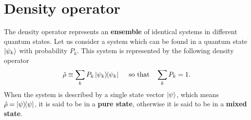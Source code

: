 %
\chapter{Density operator}
\label{ap:density-operator}

The density operator represents an \textbf{ensemble} of identical systems in different quantum states. Let us consider a system which can be found in a quantum state $ \ket{\psi_k} $ with probability $ P_{k} $. This system is represented by the following density operator
\begin{equation}
	\hat{\rho} \equiv \sum_{k} P_{k} \ketbra{\psi_k}{\psi_k}\ \ \ \ \textrm{so that}\ \ \ \sum_k P_k = 1.
\end{equation}
When the system is described by a single state vector $ \ket{\psi} $, which means $ \hat{\rho} = \ketbra{\psi}{\psi} $, it is said to be in a \textbf{pure state}, otherwise it is said to be in a \textbf{mixed state}.

